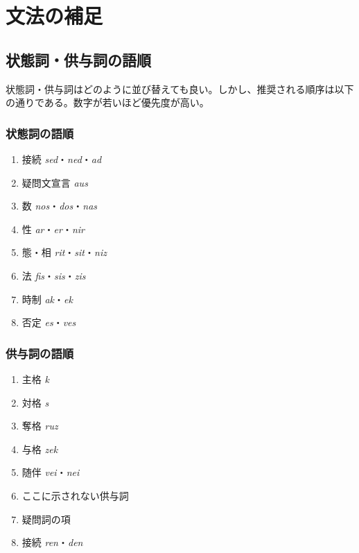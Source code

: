 \chapter{文法の補足}

\section{状態詞・供与詞の語順}

状態詞・供与詞はどのように並び替えても良い。しかし、推奨される順序は以下の通りである。数字が若いほど優先度が高い。

\begin{multicols}{2}
    \subsection{状態詞の語順}

    \begin{enumerate}
        \item 接続 \emph{sed}・\emph{ned}・\emph{ad}
        \item 疑問文宣言 \emph{aus}
        \item 数 \emph{nos}・\emph{dos}・\emph{nas}
        \item 性 \emph{ar}・\emph{er}・\emph{nir}
        \item 態・相 \emph{rit}・\emph{sit}・\emph{niz}
        \item 法 \emph{fis}・\emph{sis}・\emph{zis}
        \item 時制 \emph{ak}・\emph{ek}
        \item 否定 \emph{es}・\emph{ves}
    \end{enumerate}

    \columnbreak

    \subsection{供与詞の語順}

    \begin{enumerate}
        \item 主格 \emph{k}
        \item 対格 \emph{s}
        \item 奪格 \emph{ruz}
        \item 与格 \emph{zek}
        \item 随伴 \emph{vei}・\emph{nei}
        \item ここに示されない供与詞
        \item 疑問詞の項
        \item 接続 \emph{ren}・\emph{den}
    \end{enumerate}
\end{multicols}

